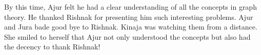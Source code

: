 By this time, Ajur felt he had a clear understanding of all the concepts in graph theory. He thanked Rishnak for presenting him such interesting problems. Ajur and Jura bade good bye to Rishnak.  Kinaja was watching them from a distance. She smiled to herself that Ajur not only understood the concepts but also had the decency to thank Rishnak!